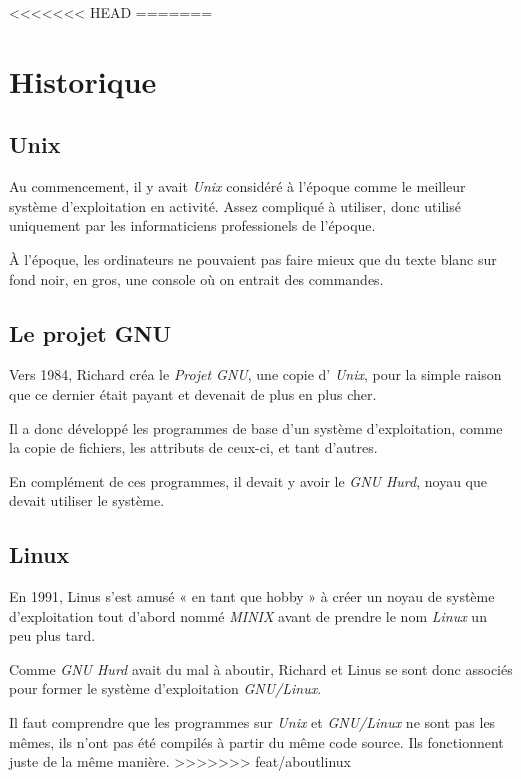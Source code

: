 <<<<<<< HEAD
=======
\chapter{Historique}

\section{Unix}

Au commencement, il y avait \emph{Unix} considéré à l'époque comme le meilleur
système d'exploitation en activité. Assez compliqué à utiliser, donc utilisé
uniquement par les informaticiens professionels de l'époque.

À l'époque, les ordinateurs ne pouvaient pas faire mieux que du texte blanc sur
fond noir, en gros, une console où on entrait des commandes.

\section{Le projet GNU}

Vers 1984, Richard  créa le \emph{Projet GNU}, une copie d'
\emph{Unix}, pour la simple raison que ce dernier était payant et devenait de
plus en plus cher.

Il a donc développé les programmes de base d'un système d'exploitation, comme
la copie de fichiers, les attributs de ceux-ci, et tant d'autres.

En complément de ces programmes, il devait y avoir le \emph{GNU Hurd}, noyau
que devait utiliser le système.

\section{Linux}

En 1991, Linus  s'est amusé « en tant que hobby » à créer un noyau
de système d'exploitation tout d'abord nommé \emph{MINIX} avant de prendre le
nom \emph{Linux} un peu plus tard.

Comme \emph{GNU Hurd} avait du mal à aboutir, Richard  et Linus
 se sont donc associés pour former le système d'exploitation
\emph{GNU/Linux}.

Il faut comprendre que les programmes sur \emph{Unix} et \emph{GNU/Linux} ne sont
pas les mêmes, ils n'ont pas été compilés à partir du même code source. Ils
fonctionnent juste de la même manière.
>>>>>>> feat/aboutlinux
